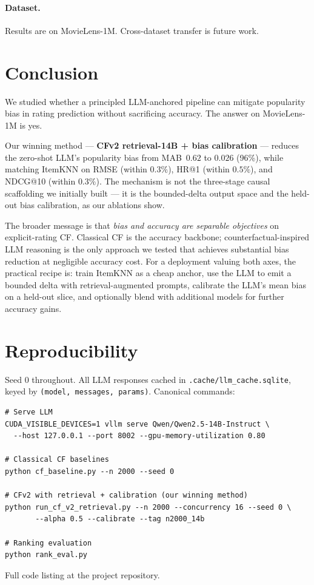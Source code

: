 \documentclass[11pt,a4paper]{article}
\begin{document}
\paragraph{Dataset.} Results are on MovieLens-1M. Cross-dataset transfer
is future work.

\section{Conclusion}

We studied whether a principled LLM-anchored pipeline can mitigate
popularity bias in rating prediction without sacrificing accuracy. The
answer on MovieLens-1M is yes.

Our winning method — \textbf{CFv2 retrieval-14B + bias calibration} --- reduces
the zero-shot LLM's popularity bias from MAB~$0.62$ to $0.026$ (96\%),
while matching ItemKNN on RMSE (within $0.3\%$), HR@1 (within $0.5\%$),
and NDCG@10 (within $0.3\%$). The mechanism is not the three-stage causal
scaffolding we initially built --- it is the bounded-delta output space and
the held-out bias calibration, as our ablations show.

The broader message is that \emph{bias and accuracy are separable
objectives} on explicit-rating CF. Classical CF is the accuracy backbone;
counterfactual-inspired LLM reasoning is the only approach we tested that
achieves substantial bias reduction at negligible accuracy cost. For a
deployment valuing both axes, the practical recipe is: train ItemKNN as a
cheap anchor, use the LLM to emit a bounded delta with
retrieval-augmented prompts, calibrate the LLM's mean bias on a held-out
slice, and optionally blend with additional models for further accuracy
gains.

\appendix
\section{Reproducibility}
Seed $0$ throughout. All LLM responses cached in
\texttt{.cache/llm\_cache.sqlite}, keyed by \texttt{(model, messages, params)}.
Canonical commands:
\begin{verbatim}
# Serve LLM
CUDA_VISIBLE_DEVICES=1 vllm serve Qwen/Qwen2.5-14B-Instruct \
  --host 127.0.0.1 --port 8002 --gpu-memory-utilization 0.80

# Classical CF baselines
python cf_baseline.py --n 2000 --seed 0

# CFv2 with retrieval + calibration (our winning method)
python run_cf_v2_retrieval.py --n 2000 --concurrency 16 --seed 0 \
       --alpha 0.5 --calibrate --tag n2000_14b

# Ranking evaluation
python rank_eval.py
\end{verbatim}
Full code listing at the project repository.
\end{document}
